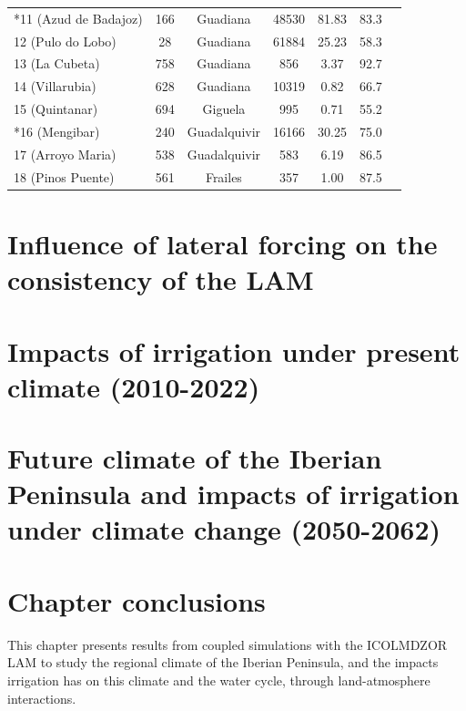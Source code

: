 \begin{table}[htbp]
{\begin{tabular}{lcccccc}
        *11 (Azud de Badajoz)   & 166   & Guadiana  & 48530     & 81.83  & 83.3 \\
        12 (Pulo do Lobo)       & 28    & Guadiana  & 61884     & 25.23  & 58.3 \\
        13 (La Cubeta)          & 758   & Guadiana  & 856       & 3.37   & 92.7 \\
        14 (Villarubia)         & 628   & Guadiana  & 10319     & 0.82   & 66.7 \\
        15 (Quintanar)          & 694   & Giguela   & 995       & 0.71   & 55.2 \\
        *16 (Mengibar)          & 240   & Guadalquivir & 16166  & 30.25  & 75.0 \\
        17 (Arroyo Maria)       & 538   & Guadalquivir & 583    & 6.19   & 86.5 \\
        18 (Pinos Puente)       & 561   & Frailes   & 357       & 1.00   & 87.5 \\
        \bottomrule
    \end{tabular}
    }
    \label{table:stations_data}
\end{table}

\clearpage

\section{Influence of lateral forcing on the consistency of the LAM}
\label{sec:forcing_influence}


\section{Impacts of irrigation under present climate (2010-2022)}
\label{sec:article1}



\section{Future climate of the Iberian Peninsula and impacts of irrigation under climate change (2050-2062)}
\label{sec:climate_change}

\clearpage

\section{Chapter conclusions}

This chapter presents results from coupled simulations with the ICOLMDZOR LAM to study the regional climate of the Iberian Peninsula, and the impacts irrigation has on this climate and the water cycle, through land-atmosphere interactions. 

